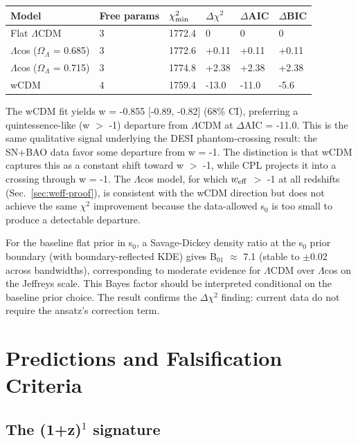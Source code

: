{\def\LTcaptype{none} %
\begin{table}[!htb]
\centering\footnotesize
\begin{tabular}{@{}llllll@{}}
\toprule
Model & Free params & $\chi^2_{\rm min}$ & $\Delta\chi^2$ & $\Delta$AIC & $\Delta$BIC \\
\midrule

Flat $\Lambda$CDM & 3 & 1772.4 & 0 & 0 & 0 \\
$\Lambda$cos ($\Omega_\Lambda$ = 0.685) & 3 & 1772.6 & +0.11 & +0.11 & +0.11 \\
$\Lambda$cos ($\Omega_\Lambda$ = 0.715) & 3 & 1774.8 & +2.38 & +2.38 & +2.38 \\
wCDM & 4 & 1759.4 & -13.0 & -11.0 & -5.6 \\
\bottomrule
\end{tabular}
\end{table}
}

The wCDM fit yields w = -0.855 {[}-0.89, -0.82{]} (68\% CI), preferring
a quintessence-like (w $>$ -1) departure from $\Lambda$CDM at $\Delta$AIC =
-11.0. This is the same qualitative signal underlying the DESI
phantom-crossing result: the SN+BAO data favor some departure from w =
-1. The distinction is that wCDM captures this as a constant shift
toward w $>$ -1, while CPL projects it into a crossing
through w = -1. The $\Lambda$cos model, for which $w_{\rm eff}$ $>$ -1 at
all redshifts (Sec.~\ref{sec:weff-proof}), is consistent with the wCDM direction but does not
achieve the same $\chi^2$ improvement because the data-allowed s$_0$ is too small
to produce a detectable departure.

For the baseline flat prior in s$_0$, a Savage-Dickey density ratio at the
s$_0$ prior boundary (with boundary-reflected KDE) gives B$_{01}$ $\approx$ 7.1 (stable
to $\pm$0.02 across bandwidths), corresponding to moderate evidence for $\Lambda$CDM
over $\Lambda$cos on the Jeffreys scale. This Bayes factor should be interpreted
conditional on the baseline prior choice. The result confirms the $\Delta\chi^2$
finding: current data do not require the ansatz's correction term.

\section{Predictions and Falsification Criteria}\label{sec:predictions}

\subsection{The (1+z)$^1$ signature}\label{sec:1z-signature}

